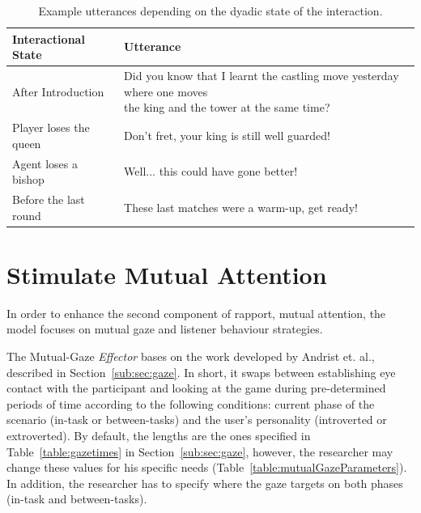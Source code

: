 \begin{table}[H]
	\centering
	\begin{tabular}{|l|l|}
	\hline
	\textbf{Interactional State} & \textbf{Utterance} \\ \hline
	After Introduction & \specialcell{Did you know that I learnt the castling move yesterday where one moves\\ the king and the tower at the same time?} \\ \hline
	Player loses the queen & Don't fret, your king is still well guarded! \\ \hline
	Agent loses a bishop & Well... this could have gone better! \\ \hline
	Before the last round & These last matches were a warm-up, get ready! \\ \hline
	\end{tabular}
	\caption{Example utterances depending on the dyadic state of the interaction.}
	\label{table:positivity_rule_examples}
\end{table}

\section{Stimulate Mutual Attention}
\label{sec:mutual_attentionModel}

In order to enhance the second component of rapport, mutual attention, the model focuses on mutual gaze and listener behaviour strategies.

The Mutual-Gaze \textit{Effector} bases on the work developed by Andrist et. al.,~\cite{Andrist2015} described in Section~\ref{sub:sec:gaze}. In short, it swaps between establishing eye contact with the participant and looking at the game during pre-determined periods of time according to the following conditions: current phase of the scenario (in-task or between-tasks) and the user's personality (introverted or extroverted). By default, the lengths are the ones specified in Table~\ref{table:gazetimes} in Section~\ref{sub:sec:gaze}, however, the researcher may change these values for his specific needs (Table~\ref{table:mutualGazeParameters}). In addition, the researcher has to specify where the gaze targets on both phases (in-task and between-tasks).

%

